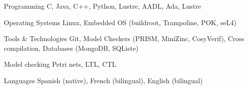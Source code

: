 


\begin{cvskills}


\cvskill
{Programming} %
{C, Java, C++, Python, Lustre, AADL, Ada, Lustre} %


\cvskill
{Operating Systems} %
{Linux, Embedded OS (buildroot, Trampoline, POK, seL4)} %


\cvskill
{Tools \& Technologies} %
{Git, Model Checkers (PRISM, MiniZinc, CosyVerif), Cross compilation, Databases 
(MongoDB, SQListe)} %


\cvskill
{Model checking} %
{Petri nets, LTL, CTL} %



\cvskill
{Languages} %
{Spanish (native), French (bilingual), English (bilingual)} %


\end{cvskills}